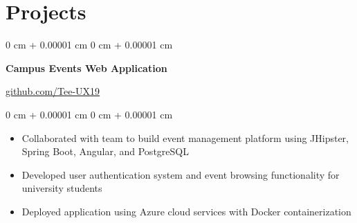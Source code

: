 \documentclass[10pt, a4paper]{article}
\newenvironment{highlights}{
    \begin{itemize}[
        topsep=0.10 cm,
        parsep=0.10 cm,
        partopsep=0pt,
        itemsep=0pt,
        leftmargin=20pt
    ]
}{
    \end{itemize}
} %
\newenvironment{onecolentry}{
    \begin{adjustwidth}{
        0 cm + 0.00001 cm
    }{
        0 cm + 0.00001 cm
    }
}{
    \end{adjustwidth}
} %
\newenvironment{twocolentry}[2][]{
    \onecolentry
    \def\secondColumn{#2}
    \setcolumnwidth{\fill, 4.5 cm}
    \begin{paracol}{2}
}{
    \switchcolumn \raggedleft \secondColumn
    \end{paracol}
    \endonecolentry
} %
\begin{document}
    \vspace{0.15 cm}

    \section{Projects}




    \begin{twocolentry}{
        \href{https://github.com/Tee-UX19}{github.com/Tee-UX19}
    }
        \textbf{Campus Events Web Application}
    \end{twocolentry}

    \vspace{0.10 cm}
    \begin{onecolentry}
        \begin{highlights}
            \item Collaborated with team to build event management platform using JHipster, Spring Boot, Angular, and PostgreSQL
            \item Developed user authentication system and event browsing functionality for university students
            \item Deployed application using Azure cloud services with Docker containerization
        \end{highlights}
    \end{onecolentry}
\end{document}
